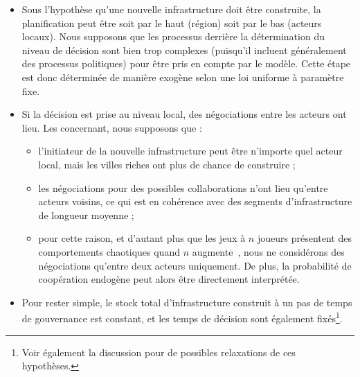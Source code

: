 {\begin{itemize}
	\item Sous l'hypothèse qu'une nouvelle infrastructure doit être construite, la planification peut être soit par le haut (région) soit par le bas (acteurs locaux). Nous supposons que les processus derrière la détermination du niveau de décision sont bien trop complexes (puisqu'il incluent généralement des processus politiques) pour être pris en compte par le modèle. Cette étape est donc déterminée de manière exogène selon une loi uniforme à paramètre fixe.%
	\item Si la décision est prise au niveau local, des négociations entre les acteurs ont lieu. Les concernant, nous supposons que :
	\begin{itemize}
		\item l'initiateur de la nouvelle infrastructure peut être n'importe quel acteur local, mais les villes riches ont plus de chance de construire ;
		\item les négociations pour des possibles collaborations n'ont lieu qu'entre acteurs voisins, ce qui est en cohérence avec des segments d'infrastructure de longueur moyenne ;
		\item pour cette raison, et d'autant plus que les jeux à $n$ joueurs présentent des comportements chaotiques quand $n$ augmente~\cite{2016arXiv161208111S}, nous ne considérons des négociations qu'entre deux acteurs uniquement. De plus, la probabilité de coopération endogène peut alors être directement interprétée.
	\end{itemize}
	\item Pour rester simple, le stock total d'infrastructure construit à un pas de temps de gouvernance est constant, et les temps de décision sont également fixés\footnote{Voir également la discussion pour de possibles relaxations de ces hypothèses.}.
\end{itemize}
}








